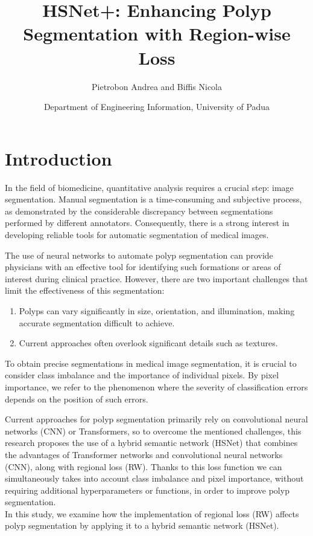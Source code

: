 \documentclass[
	a4paper, %
	10pt, %
	unnumberedsections, %
	twoside, %
]{LTJournalArticle}
\title{HSNet+: Enhancing Polyp Segmentation with Region-wise Loss} %
\author{Pietrobon Andrea and Biffis Nicola}
\date{Department of Engineering Information, University of Padua}
\begin{document}
\maketitle %


\section{Introduction}

In the field of biomedicine, quantitative analysis requires a crucial step: image segmentation. Manual segmentation is a time-consuming and subjective process, as demonstrated by the considerable discrepancy between segmentations performed by different annotators. Consequently, there is a strong interest in developing reliable tools for automatic segmentation of medical images.

The use of neural networks to automate polyp segmentation can provide physicians with an effective tool for identifying such formations or areas of interest during clinical practice. However, there are two important challenges that limit the effectiveness of this segmentation:

\begin{enumerate}
	\item Polyps can vary significantly in size, orientation, and illumination, making accurate segmentation difficult to achieve.
	\item Current approaches often overlook significant details such as textures.
\end{enumerate}

To obtain precise segmentations in medical image segmentation, it is crucial to consider class imbalance and the importance of individual pixels. By pixel importance, we refer to the phenomenon where the severity of classification errors depends on the position of such errors.

Current approaches for polyp segmentation primarily rely on convolutional neural networks (CNN) or Transformers, so to overcome the mentioned challenges, this research proposes the use of a hybrid semantic network (HSNet) that combines the advantages of Transformer networks and convolutional neural networks (CNN), along with regional loss (RW).
Thanks to this loss function we can simultaneously takes into account class imbalance and pixel importance, without requiring additional hyperparameters or functions, in order to improve polyp segmentation.
\\
In this study, we examine how the implementation of regional loss (RW) affects polyp segmentation by applying it to a hybrid semantic network (HSNet).
\end{document}
